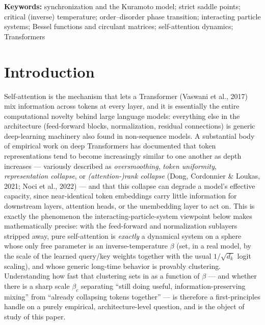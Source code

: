 \documentclass[11pt]{article}
\begin{document}
\noindent\textbf{Keywords:} synchronization and the Kuramoto model; strict saddle points; critical (inverse) temperature; order--disorder phase transition; interacting particle systems; Bessel functions and circulant matrices; self-attention dynamics; Transformers

\section{Introduction}
\label{sec:intro}

Self-attention is the mechanism that lets a Transformer (Vaswani et al., 2017) mix information across tokens at every layer, and it is essentially the entire computational novelty behind large language models: everything else in the architecture (feed-forward blocks, normalization, residual connections) is generic deep-learning machinery also found in non-sequence models. A substantial body of empirical work on deep Transformers has documented that token representations tend to become increasingly similar to one another as depth increases --- variously described as \emph{oversmoothing}, \emph{token uniformity}, \emph{representation collapse}, or \emph{(attention-)rank collapse} (Dong, Cordonnier \& Loukas, 2021; Noci et al., 2022) --- and that this collapse can degrade a model's effective capacity, since near-identical token embeddings carry little information for downstream layers, attention heads, or the unembedding layer to act on. This is exactly the phenomenon the interacting-particle-system viewpoint below makes mathematically precise: with the feed-forward and normalization sublayers stripped away, pure self-attention is \emph{exactly} a dynamical system on a sphere whose only free parameter is an inverse-temperature $\beta$ (set, in a real model, by the scale of the learned query/key weights together with the usual $1/\sqrt{d_k}$ logit scaling), and whose generic long-time behavior is provably clustering. Understanding how fast that clustering sets in as a function of $\beta$ --- and whether there is a sharp scale $\beta_c$ separating ``still doing useful, information-preserving mixing'' from ``already collapsing tokens together'' --- is therefore a first-principles handle on a purely empirical, architecture-level question, and is the object of study of this paper.
\end{document}
